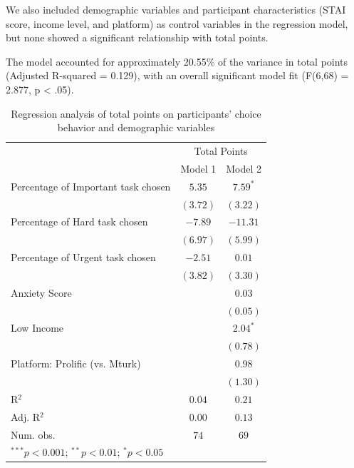 \documentclass[
]{article}
\begin{document}
We also included demographic variables and participant characteristics
(STAI score, income level, and platform) as control variables in the
regression model, but none showed a significant relationship with total
points.

The model accounted for approximately 20.55\% of the variance in total
points (Adjusted R-squared = 0.129), with an overall significant model
fit (F(6,68) = 2.877, p \textless{} .05).

\begin{table}

\caption{\label{tbl-totalpoints}Regression analysis of total points on
participants' choice behavior and demographic
variables}\begin{minipage}[t]{\linewidth}

{\centering 

\begin{center}
\begin{tabular}{l c c}
\hline
 & \multicolumn{2}{c}{Total Points} \\
\cline{2-3}
 & Model 1 & Model 2 \\
\hline
Percentage of Important task chosen & $5.35$   & $7.59^{*}$ \\
                                    & $(3.72)$ & $(3.22)$   \\
Percentage of Hard task chosen      & $-7.89$  & $-11.31$   \\
                                    & $(6.97)$ & $(5.99)$   \\
Percentage of Urgent task chosen    & $-2.51$  & $0.01$     \\
                                    & $(3.82)$ & $(3.30)$   \\
Anxiety Score                       &          & $0.03$     \\
                                    &          & $(0.05)$   \\
Low Income                          &          & $2.04^{*}$ \\
                                    &          & $(0.78)$   \\
Platform: Prolific (vs. Mturk)      &          & $0.98$     \\
                                    &          & $(1.30)$   \\
\hline
R$^2$                               & $0.04$   & $0.21$     \\
Adj. R$^2$                          & $0.00$   & $0.13$     \\
Num. obs.                           & $74$     & $69$       \\
\hline
\multicolumn{3}{l}{\scriptsize{$^{***}p<0.001$; $^{**}p<0.01$; $^{*}p<0.05$}}
\end{tabular}


\end{center}}
\end{minipage}
\end{table}
\end{document}
